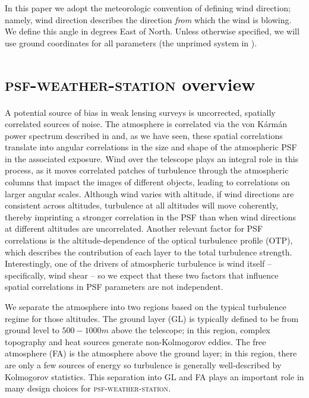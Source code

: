 \documentclass[twocolumn]{aastex631}
\newcommand{\psfws}{\textsc{psf-weather-station}\xspace}
\newcommand{\vk}{von K\'arm\'an\xspace}
\begin{document}
In this paper we adopt the meteorologic convention of defining wind direction; namely, wind direction describes the direction \textit{from} which the wind is blowing.
We define this angle in degrees East of North.
Unless otherwise specified, we will use ground coordinates for all parameters (the unprimed system in ).


\section{\psfws overview} \label{sec:psfws}
A potential source of bias in weak lensing surveys is uncorrected, spatially correlated sources of noise. 
The atmosphere is correlated via the \vk power spectrum described in  and, as we have seen, these spatial correlations translate into angular correlations in the size and shape of the atmospheric PSF in the associated exposure.
Wind over the telescope plays an integral role in this process, as it moves correlated patches of turbulence through the atmospheric columns that  impact the images of different objects, leading to correlations on larger angular scales. 
Although wind varies with altitude, if wind directions are consistent across altitudes, turbulence at all altitudes will move coherently, thereby imprinting a stronger correlation in the PSF than when wind directions at different altitudes are uncorrelated. 
Another relevant factor for PSF correlations is the altitude-dependence of the optical turbulence profile (OTP), which describes the contribution of each layer to the total turbulence strength.
Interestingly, one of the drivers of atmospheric turbulence is wind itself -- specifically, wind shear -- so we expect that these two factors that influence spatial correlations in PSF parameters are not independent.

We separate the atmosphere into two regions based on the typical turbulence regime for those altitudes.
The ground layer (GL) is typically defined to be from ground level to $500-1000\unit{m}$ above the telescope; in this region, complex topography and heat sources generate non-Kolmogorov eddies.  The free atmosphere (FA) is the atmosphere above the ground layer; in this region, there are only a few sources of energy so turbulence is generally well-described by Kolmogorov statistics.
This separation into GL and FA plays an important role in many design choices for \psfws.
\end{document}
